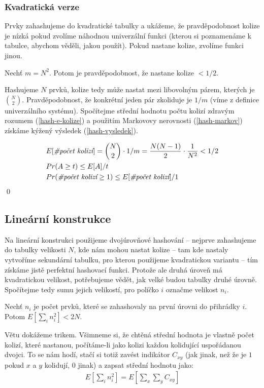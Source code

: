 \documentclass{article}
\begin{document}
\subsubsection{Kvadratická verze}
Prvky zahashujeme do kvadratické tabulky a ukážeme, že pravděpodobnost kolize je 
nízká pokud zvolíme náhodnou univerzální funkci (kterou si poznamenáme k 
tabulce, abychom věděli, jakou použít). Pokud nastane kolize, zvolíme funkci 
jinou.

\vt Nechť $m = N^2$. Potom je pravděpodobnost, že nastane kolize $<1/2$.

\dk Hashujeme $N$ prvků, kolize tedy může nastat mezi libovolným párem, kterých 
je $\binom{N}{2}$. Pravděpodobnost, že konkrétní jeden pár zkoliduje je $1/m$ 
(víme z definice univerzálního systému). Spočítejme střední hodnotu počtu kolizí 
zdravým rozumem (\ref{hash-e-kolize}) a použitím Markovovy nerovnosti 
(\ref{hash-markov}) získáme kýžený výsledek (\ref{hash-vysledek}).

\begin{align}
	\label{hash-e-kolize}
	&E[\text{\it\#počet kolizí}] = \binom{N}{2} \cdot 1/m = \frac{N(N-1)}{2} 
	\cdot \frac{1}{N^2}< 1/2\\
	\label{hash-markov}
	&Pr(A\geq t) \leq E[A] / t \\
	\label{hash-vysledek}
	&Pr(\text{\it\#počet kolizí}\geq1) \leq E[\text{\it\#počet kolizí}]/1
\end{align}
\qed

\subsection{Lineární konstrukce}
Na lineární konstrukci použijeme dvojúrovňové hashování -- nejprve zahashujeme 
do tabulky velikosti $N$, kde nám mohou nastat kolize -- tam kde nastaly 
vytvoříme sekundární tabulku, pro kterou použijeme kvadratickou variantu -- tím 
získáme jistě perfektní hashovací funkci. Protože ale druhá úroveň má
kvadratickou velikost, potřebujeme vědět, jak velké budou tabulky druhé úrovně.
Spočítejme tedy sumu jejich velikostí, pro políčko $i$ označme velikost $n_i$.

\vt Nechť $n_i$ je počet prvků, které se zahashovaly na první úrovni do 
přihrádky $i$. Potom $E[\sum_i n_i^2] < 2N$.

\dk Větu dokážeme trikem. Všimneme si, že chtěná střední hodnota je vlastně 
počet kolizí, které nastanou, počítáme-li jako kolizi každou kolidující 
uspořádanou dvojci. To se nám hodí, stačí si totiž zavést indikátor $C_{xy}$
(jak jinak, než že je $1$ pokud $x$ a $y$ kolidují, $0$ jinak) a zapsat střední 
hodnotu jako:
\begin{align}
	E[\sum_in_i^2] = E[\sum_x\sum_y C_{xy}]
\end{align}
\end{document}
